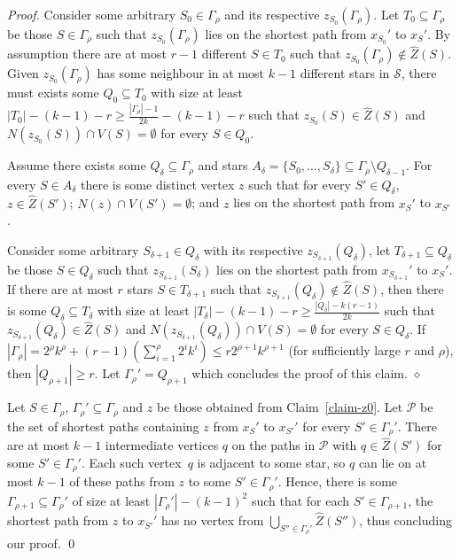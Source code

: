 \documentclass[runningheads,envcountsame]{llncs}
\newcommand{\PPP}{\mathcal{P}}
\newenvironment{claimproof}
{\noindent {\em Proof of Claim:} }
{\hfill $\diamond$ \smallskip}
\begin{document}
\begin{proof}
\begin{claimproof}
      Consider some arbitrary $S_0 \in \Gamma_{\rho}$ and its respective
      $z_{S_0}(\Gamma_{\rho})$. Let $T_0 \subseteq \Gamma_{\rho}$ be those
      $S \in \Gamma_{\rho}$ such that $z_{S_0}(\Gamma_{\rho})$ lies on the
      shortest path from $x_{S_0}'$ to $x_{S}'$. By assumption there are
      at most $r-1$ different $S \in T_0$ such that
      $z_{S_0}(\Gamma_{\rho}) \notin \hat{Z}(S)$. Given $z_{S_0}(\Gamma_{\rho})$
      has some neighbour in at most $k-1$ different stars in $\mathcal{S}$,
      there must exists some $Q_0 \subseteq T_0$ with size at least
      $|T_0|-(k-1)-r \geq \frac{|\Gamma_{\rho}|-1}{2k}-(k-1)-r$
      such that $z_{S_0}(S) \in \hat{Z}(S)$ and
      $N(z_{S_0}(S)) \cap V(S) = \emptyset$ for every $S \in Q_0$.

      Assume there exists some $Q_{\delta} \subseteq \Gamma_\rho$ and stars $A_{\delta} = \{S_0, \ldots, S_{\delta}\} \subseteq \Gamma_\rho \setminus Q_{\delta-1}$. For every $S \in A_{\delta}$ there is some distinct vertex
      $z$ such that for every $S' \in Q_{\delta}$, $z \in \hat{Z}(S')$;
      $N(z) \cap V(S') = \emptyset$; and $z$ lies on the shortest path
      from $x_S'$ to $x_{S'}$.
      
      Consider some arbitrary $S_{\delta+1} \in Q_{\delta}$ with its respective
      $z_{S_{\delta+1}}(Q_{\delta})$, let $T_{\delta+1} \subseteq Q_{\delta}$
      be those $S \in Q_{\delta}$ such that $z_{S_{\delta+1}}(S_{\delta})$
      lies on the shortest path from $x_{S_{\delta+1}}'$ to $x_{S}'$.
      If there are at most $r$ stars $S \in T_{\delta+1}$ such that
      $z_{S_{\delta+1}}(Q_{\delta}) \notin \hat{Z}(S)$, then there is some
      $Q_{\delta} \subseteq T_{\delta}$ with size at least
      $|T_{\delta}|-(k-1)-r \geq \frac{|Q_{\delta}|-k(r-1)}{2k}$
      such that $z_{S_{\delta+1}}(Q_{\delta}) \in \hat{Z}(S)$ and
      $N(z_{S_{\delta+1}}(Q_{\delta})) \cap V(S) = \emptyset$ for every
      $S \in Q_{\delta}$. If $|\Gamma_\rho| = 2^{\rho}k^{\rho}+(r-1)(\sum_{i=1}^{\rho} 2^{i}k^{i}) \leq r2^{\rho+1}k^{\rho+1}$ (for sufficiently large $r$ and $\rho$), then $|Q_{\rho+1}| \geq r$. Let $\Gamma_\rho' = Q_{\rho+1}$ which concludes the proof of this claim.
  \end{claimproof}

\noindent
    Let $S \in \Gamma_\rho$, $\Gamma_\rho'\subseteq\Gamma_\rho$ and $z$ be those
    obtained from Claim~\ref{claim-z0}. Let $\PPP$ be the set of
    shortest paths containing $z$ from $x_S'$ to $x_{S'}'$ for every
    $S' \in \Gamma_\rho'$. There are at most $k-1$
    intermediate vertices $q$ on the paths in $\PPP$ with $q \in \hat{Z}(S')$ for some
    $S' \in \Gamma_\rho'$. Each such vertex~$q$ is
    adjacent to some star, so $q$ can lie on at most $k-1$ of these paths
    from $z$ to some $S' \in \Gamma_\rho'$. Hence, there is some 
    $\Gamma_{\rho+1} \subseteq \Gamma_{\rho}'$ of size at least
    $|\Gamma_\rho'|-(k-1)^2$ such that for each $S' \in \Gamma_{\rho+1}$,
    the shortest path from $z$ to $x_{S'}'$ has no vertex from
    $\bigcup_{S'' \in \Gamma_\rho'}\hat{Z}(S'')$, thus concluding our proof. \qed
\end{proof}
\end{document}

